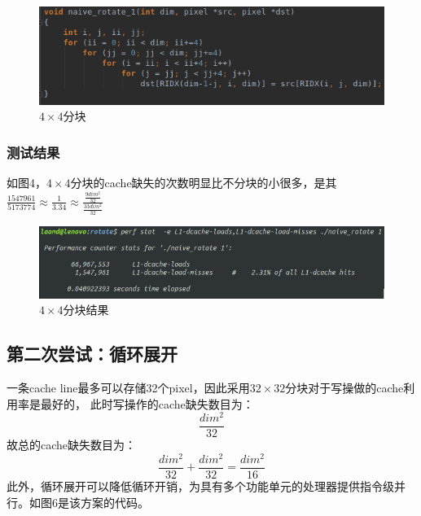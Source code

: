 \documentclass[12pt]{article}
\begin{document}
\begin{figure}[h]
\begin{center}
\includegraphics[width=\textwidth]{c1.png} %
\caption{$4 \times 4$分块}
\end{center}
\end{figure}

\subsubsection{测试结果}
如图4，$4 \times 4$分块的cache缺失的次数明显比不分块的小很多，是其
$\frac{1547961}{5173774}\approx \frac{1}{3.34}\approx \frac{\frac{9dim^2}{32}}{\frac{33dim^2}{32}}$
\begin{figure}[h]
\begin{center}
\includegraphics[width=\textwidth]{p1.png} %
\caption{$4 \times 4$分块结果}
\end{center}
\end{figure}

\newpage
\subsection{第二次尝试：循环展开}
一条cache line最多可以存储32个pixel，因此采用$32 \times 32$分块对于写操做的cache利用率是最好的，
此时写操作的cache缺失数目为：
\begin{equation}
  \frac{dim^2}{32}
\end{equation}
故总的cache缺失数目为：
\begin{equation}
  \frac{dim^2}{32} + \frac{dim^2}{32} = \frac{dim^2}{16}
\end{equation}
此外，循环展开可以降低循环开销，为具有多个功能单元的处理器提供指令级并行。如图6是该方案的代码。
\end{document}
